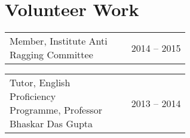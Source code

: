 \documentclass[a4paper]{article} %
\newcommand{\verticalspacing}{-0.25cm}
\newcommand{\headspace}{-0.3cm}
\newcommand{\bulletspace}{0.7cm}
\newcommand{\projectheadspacing}{6.9cm}
\newcommand{\cproject}[5]{%
    \begin{tabular}{p{0.60\linewidth}r}
        \textcolor{NavyBlue}{\small #2} & \multicolumn{1}{m{ \projectheadspacing{} }}{\raggedleft \small {\textsc{#1}}}\\
        \small {#3} & \small {#4}
    \end{tabular}\\
    \begin{tabular}{p{0.98\linewidth}}
    \vspace{-0.3cm}
        \small{#5}
    \end{tabular}
    \vspace{\verticalspacing{}}
}
\newcommand{\gitproject}[3]{%
    \begin{tabular}{p{0.60\linewidth}r}
        \textcolor{NavyBlue}{\small #2} & \multicolumn{1}{m{ \projectheadspacing{} }}{\raggedleft #1}\\
    \end{tabular}\\
    \begin{tabular}{p{0.98\linewidth}}
        \vspace{\headspace{}}
        \small{#3}
    \end{tabular}
    \vspace{\verticalspacing{}}
    \vspace{-0.2cm} %
}
\newcommand{\skill}[2]{%
    \begin{tabular}{p{0.60\linewidth}r}
        \small {#2} & \multicolumn{1}{m{ \projectheadspacing{} }}{\raggedleft \textsc{\small #1}}\\
    \end{tabular}
    \vspace{\verticalspacing{}}
}
\begin{document}



\section{Volunteer Work}

\skill
    {2014 -- 2015}
    {Member, Institute Anti Ragging Committee}

%

\skill
    {2013 -- 2014}
    {Tutor, English Proficiency Programme, Professor Bhaskar Das Gupta}

\end{document}
